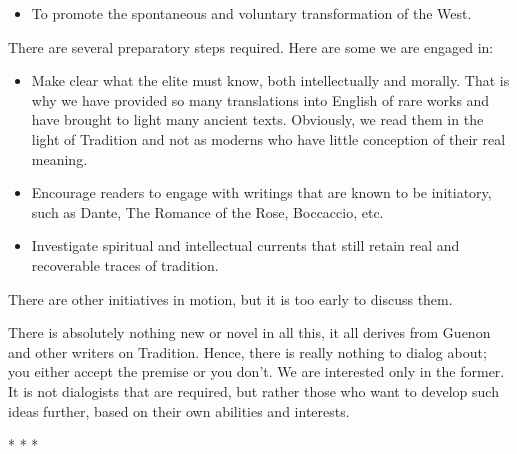 \begin{itemize}
\item To promote the spontaneous and voluntary transformation of the West. 
\end{itemize}
There are several preparatory steps required. Here are some we are engaged in:

\begin{itemize}
\item Make clear what the elite must know, both intellectually and morally. That is why we have provided so many
translations into English of rare works and have brought to light many ancient texts. Obviously, we read them in the
light of Tradition and not as moderns who have little conception of their real meaning. 
\item Encourage readers to engage with writings that are known to be initiatory, such as Dante, The Romance of the Rose,
Boccaccio, etc. 
\item Investigate spiritual and intellectual currents that still retain real and recoverable traces of tradition. 
\end{itemize}
There are other initiatives in motion, but it is too early to discuss them.

There is absolutely nothing new or novel in all this, it all derives from Guenon and other writers on Tradition. Hence,
there is really nothing to dialog about; you either accept the premise or you don't. We are
interested only in the former. It is not dialogists that are required, but rather those who want to develop such ideas
further, based on their own abilities and interests.




\begin{center}* * *\end{center}

